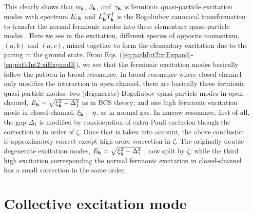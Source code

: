 This clearly shows that $\alpha_{\mathbf{k}}$, $\beta_{\mathbf{k}}$, and $\gamma_{\mathbf{k}}$ is fermionic quasi-particle excitation modes with spectrum $E_{i\,\mathbf{k}}$ and   $L^{\dagger}_{\mathbf{k}}T^{\dagger}_{\mathbf{k}}$ is  the Bogoliubov canonical transformation to transfer the normal fermionic modes into these elementary quasi-particle modes .  Here we see in the excitation, different species of opposite momentum, $(a,b)$ and $(a,c)$, mixed together to form the elementary excitation due to the paring in the ground state.  
  From Eqs. (\ref{eq:pathInt2:xiExpand}-\ref{eq:pathInt2:xiExpand3}), we see that the fermionic excitation modes basically follow the pattern in broad resonance.  In broad resonance where closed channel only modifies the interaction in open channel,  there are basically three fermionic quasi-particle modes: two (degenerate) Bogoliubov quasi-particle modes  in open channel, $E_{\mathbf{k}}=\sqrt{\xi^{2}_{\mathbf{k}}+\Delta_{1}^{2}}$ as in BCS theory; and one high fermionic excitation mode in closed-channel, $\xi_{\mathbf{k}}+\eta$, as in normal gas.  In narrow resonance, first of all, the gap $\Delta_{1}$ is modified  by consideration of extra Pauli exclusion though the correction is in order of $\zeta$.  Once that is taken into account, the above conclusion is approximately correct except high-order correction in $\zeta$.   The originally double degenerate excitation modes, $E_{\mathbf{k}}=\sqrt{\xi^{2}_{\mathbf{k}}+\Delta_{1}^{2}}$ , now split by $\zeta$; while the third high excitation corresponding the normal fermionic excitation in closed-channel has a small correction in the same order. 

\section{Collective excitation mode}
%

